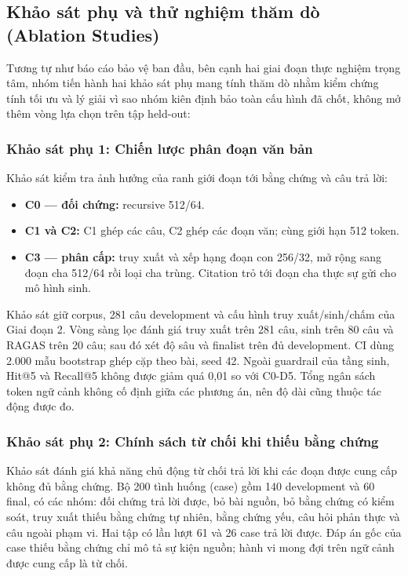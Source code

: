 \subsection{Khảo sát phụ và thử nghiệm thăm dò (Ablation Studies)}\label{sec:side-ablations}
Tương tự như báo cáo bảo vệ ban đầu, bên cạnh hai giai đoạn thực nghiệm trọng tâm, nhóm tiến hành hai khảo sát phụ mang tính thăm dò nhằm kiểm chứng tính tối ưu và lý giải vì sao nhóm kiên định bảo toàn cấu hình đã chốt, không mở thêm vòng lựa chọn trên tập held-out:

\subsubsection{Khảo sát phụ 1: Chiến lược phân đoạn văn bản}\label{sec:chunking}
Khảo sát kiểm tra ảnh hưởng của ranh giới đoạn tới bằng chứng và câu trả lời:
\begin{itemize}
\item \textbf{C0 — đối chứng:} recursive 512/64.
\item \textbf{C1 và C2:} C1 ghép các câu, C2 ghép các đoạn văn; cùng giới hạn 512 token.
\item \textbf{C3 — phân cấp:} truy xuất và xếp hạng đoạn con 256/32, mở rộng sang đoạn cha 512/64 rồi loại cha trùng. Citation trỏ tới đoạn cha thực sự gửi cho mô hình sinh.
\end{itemize}

Khảo sát giữ corpus, 281 câu development và cấu hình truy xuất/sinh/chấm của Giai đoạn 2. Vòng sàng lọc đánh giá truy xuất trên 281 câu, sinh trên 80 câu và RAGAS trên 20 câu; sau đó xét độ sâu và finalist trên đủ development. CI dùng 2.000 mẫu bootstrap ghép cặp theo bài, seed 42. Ngoài guardrail của tầng sinh, Hit@5 và Recall@5 không được giảm quá 0,01 so với C0-D5. Tổng ngân sách token ngữ cảnh không cố định giữa các phương án, nên độ dài cũng thuộc tác động được đo.


\subsubsection{Khảo sát phụ 2: Chính sách từ chối khi thiếu bằng chứng}\label{sec:abstention}
Khảo sát đánh giá khả năng chủ động từ chối trả lời khi các đoạn được cung cấp không đủ bằng chứng. Bộ 200 tình huống (case) gồm 140 development và 60 final, có các nhóm: đối chứng trả lời được, bỏ bài nguồn, bỏ bằng chứng có kiểm soát, truy xuất thiếu bằng chứng tự nhiên, bằng chứng yếu, câu hỏi phản thực và câu ngoài phạm vi. Hai tập có lần lượt 61 và 26 case trả lời được. Đáp án gốc của case thiếu bằng chứng chỉ mô tả sự kiện nguồn; hành vi mong đợi trên ngữ cảnh được cung cấp là từ chối.

